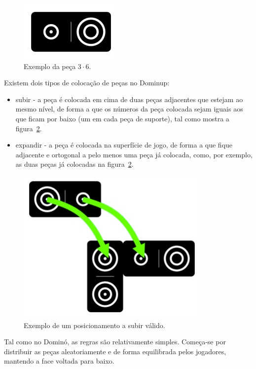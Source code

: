 \documentclass[a4paper]{article}
\begin{document}
\begin{figure}[h!]
\begin{center}
\includegraphics[scale=0.5]{piece.jpg}
\caption{Exemplo da peça $3 \cdot 6$.}
\label{piece}
\end{center}
\end{figure}

Existem dois tipos de colocação de peças no Dominup:
\begin{itemize}
	\item subir - a peça é colocada em cima de duas peças adjacentes que estejam ao mesmo nível, de forma a que os números da peça colocada sejam iguais aos que ficam por baixo (um em cada peça de suporte), tal como mostra a figura~\ref{climb}.
	\item expandir - a peça é colocada na superfície de jogo, de forma a que fique adjacente e ortogonal a pelo menos uma peça já colocada, como, por exemplo, as duas peças já colocadas na figura~\ref{climb}.
\end{itemize}

\begin{figure}[h!]
\begin{center}
\includegraphics[scale=0.6]{climb.jpg}
\caption{Exemplo de um posicionamento a subir válido.}
\label{climb}
\end{center}
\end{figure}

Tal como no Dominó, as regras são relativamente simples. Começa-se por distribuir as peças aleatoriamente e de forma equilibrada pelos jogadores, mantendo a face voltada para baixo. 
\end{document}
